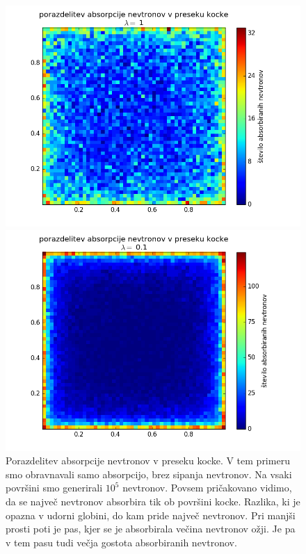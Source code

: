 \documentclass[slovene,11pt,a4paper]{article}
\numberwithin{equation}{section} %
\numberwithin{figure}{section} %
\numberwithin{table}{section} %
\begin{document}
\begin{figure}[!htb]
\centering
\begin{minipage}{0.5\textwidth}
\centering
\includegraphics[scale=0.45]{slike/porazdelitev_lamda_1n_100000.png}
\end{minipage}\hfill
\begin{minipage}{0.5\textwidth}
\centering
\includegraphics[scale=0.45]{slike/porazdelitev_lamda_0_1n_100000.png}
\end{minipage}
\caption{ Porazdelitev absorpcije nevtronov v preseku kocke. V tem primeru smo obravnavali samo absorpcijo, brez sipanja nevtronov. Na vsaki površini smo generirali $10^5$ nevtronov. Povsem pričakovano vidimo, da se največ nevtronov absorbira tik ob površini kocke. Razlika, ki je opazna v udorni globini, do kam pride največ nevtronov. Pri manjši prosti poti je pas, kjer se je absorbirala večina nevtronov ožji. Je pa v tem pasu tudi večja gostota absorbiranih nevtronov.}
\end{figure}
\end{document}
